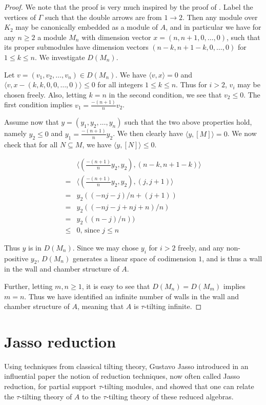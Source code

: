 \documentclass[]{article}
\theoremstyle{definition}
\newcommand{\tu}{\ensuremath{\tau}}
\begin{document}
\begin{proof}
	We note that the proof is very much inspired by the proof of \cite[Theorem 4.14]{Br_stle_2019}. Label the vertices of $\Gamma$ such that the double arrows are from $1 \to 2$. Then any module over $K_2$ may be canonically embedded as a module of $A$, and in particular we have for any $n \geq 2$ a module $M_n$ with dimension vector $x = (n,n+1,0,\dots,0)$, such that its proper submodules have dimension vectors $(n-k,n+1-k,0,\dots,0)$ for $1 \leq k \leq n$. We investigate $D(M_n)$.
	
	Let $v = (v_1,v_2,\dots,v_n) \in D(M_n)$. We have $\langle v,x \rangle = 0$ and $\langle v,x - (k,k,0,0,\dots,0)\rangle \leq 0$ for all integers $1 \leq k \leq n$. Thus for $i > 2$, $v_i$ may be chosen freely. Also, letting $k = n$ in the second condition, we see that $v_2 \leq 0$. The first condition implies $v_1 = \frac{-(n+1)}{n}v_2$.
	
	Assume now that $y = (y_1,y_2,\dots,y_n)$ such that the two above properties hold, namely $y_2 \leq 0$ and $y_1 = \frac{-(n+1)}{n}y_2$. We then clearly have $\langle y,[M]\rangle = 0$. We now check that for all $N \subseteq M$, we have $\langle y,[N]\rangle \leq 0$. 
	
	\begin{align}
	&\langle (\frac{-(n+1)}{n}y_2,y_2), (n-k,n+1-k)\rangle \\
	=&\langle (\frac{-(n+1)}{n}y_2,y_2), (j,j+1)\rangle \\
	=& y_2((-nj-j)/n + (j+1)) \\
	 =& y_2((-nj - j + nj + n)/n) \\
	 =& y_2((n-j)/n)) \\
	 \leq& 0\text{, since } j \leq n
	\end{align}
	
	Thus $y$ is in $D(M_n)$. Since we may chose $y_i$ for $i > 2$ freely, and any non-positive $y_2$, $D(M_n)$ generates a linear space of codimension $1$, and is thus a wall in the wall and chamber structure of $A$.
	
	Further, letting $m,n \geq 1$, it is easy to see that $D(M_n) = D(M_m)$ implies $m = n$. Thus we have identified an infinite number of walls in the wall and chamber structure of $A$, meaning that $A$ is \tu-tilting infinite.
 
\end{proof}

\section{Jasso reduction}
Using techniques from classical tilting theory, Gustavo Jasso\cite{jassoreduction} introduced in an influential paper the notion of reduction techniques, now often called Jasso reduction, for partial support \tu-tilting modules, and showed that one can relate the \tu-tilting theory of $A$ to the \tu-tilting theory of these reduced algebras.
\end{document}
